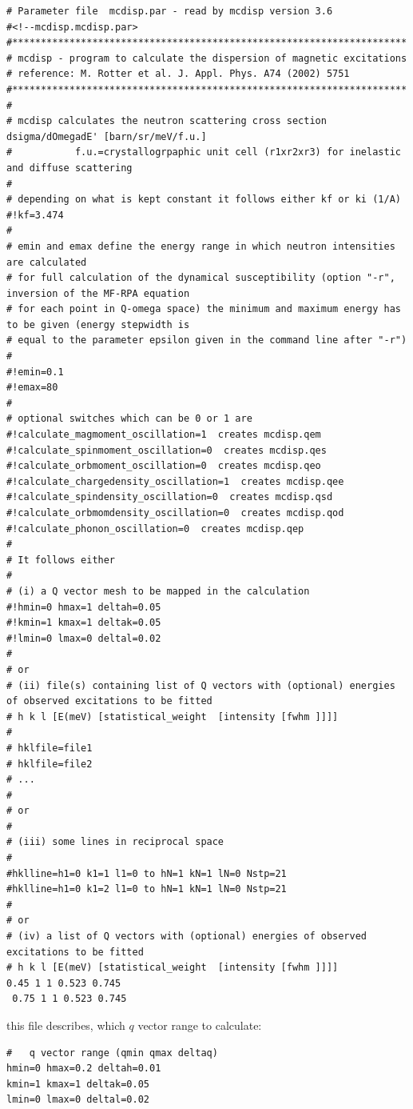 {\footnotesize
\begin{verbatim}
# Parameter file  mcdisp.par - read by mcdisp version 3.6
#<!--mcdisp.mcdisp.par>
#*********************************************************************
# mcdisp - program to calculate the dispersion of magnetic excitations
# reference: M. Rotter et al. J. Appl. Phys. A74 (2002) 5751
#*********************************************************************
#
# mcdisp calculates the neutron scattering cross section dsigma/dOmegadE' [barn/sr/meV/f.u.]
#           f.u.=crystallogrpaphic unit cell (r1xr2xr3) for inelastic and diffuse scattering
#
# depending on what is kept constant it follows either kf or ki (1/A)
#!kf=3.474
# 
# emin and emax define the energy range in which neutron intensities are calculated
# for full calculation of the dynamical susceptibility (option "-r", inversion of the MF-RPA equation 
# for each point in Q-omega space) the minimum and maximum energy has to be given (energy stepwidth is 
# equal to the parameter epsilon given in the command line after "-r")
#
#!emin=0.1
#!emax=80
#
# optional switches which can be 0 or 1 are
#!calculate_magmoment_oscillation=1  creates mcdisp.qem
#!calculate_spinmoment_oscillation=0  creates mcdisp.qes
#!calculate_orbmoment_oscillation=0  creates mcdisp.qeo
#!calculate_chargedensity_oscillation=1  creates mcdisp.qee
#!calculate_spindensity_oscillation=0  creates mcdisp.qsd
#!calculate_orbmomdensity_oscillation=0  creates mcdisp.qod
#!calculate_phonon_oscillation=0  creates mcdisp.qep
#
# It follows either 
#
# (i) a Q vector mesh to be mapped in the calculation
#!hmin=0 hmax=1 deltah=0.05
#!kmin=1 kmax=1 deltak=0.05
#!lmin=0 lmax=0 deltal=0.02
#
# or 
# (ii) file(s) containing list of Q vectors with (optional) energies of observed excitations to be fitted
# h k l [E(meV) [statistical_weight  [intensity [fwhm ]]]]
#
# hklfile=file1
# hklfile=file2
# ...
#
# or
#
# (iii) some lines in reciprocal space 
#
#hklline=h1=0 k1=1 l1=0 to hN=1 kN=1 lN=0 Nstp=21
#hklline=h1=0 k1=2 l1=0 to hN=1 kN=1 lN=0 Nstp=21
#
# or
# (iv) a list of Q vectors with (optional) energies of observed excitations to be fitted
# h k l [E(meV) [statistical_weight  [intensity [fwhm ]]]]
0.45 1 1 0.523 0.745
 0.75 1 1 0.523 0.745

\end{verbatim}
}

this file describes, which $q$ vector range to
calculate:

\begin{verbatim}
#   q vector range (qmin qmax deltaq)
hmin=0 hmax=0.2 deltah=0.01
kmin=1 kmax=1 deltak=0.05
lmin=0 lmax=0 deltal=0.02
\end{verbatim}

